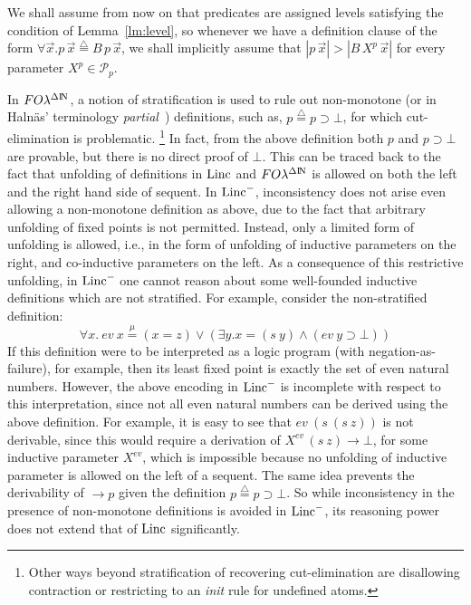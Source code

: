\documentclass[preprint]{elsarticle}
\def\Pscr{{\mathcal P}}
\newcommand{\FOL   }{FO\lambda}
\newcommand{\FOLDN }{\FOL^{\Delta\N}}
\newcommand{\Linc}{{\rm Linc}^-}
\newcommand{\fLinc}{{\rm Linc}}
\newcommand{\N}{{\rm I} \! {\rm N}}
\newcommand{\Seq}[2]{#1\longrightarrow #2}
\newcommand{\defeq}{\stackrel{\scriptscriptstyle\triangle}{=}}
\newcommand{\defmu}{\stackrel{\mu}{=}}
\newcommand{\oimp}{\supset}
\begin{document}
We shall assume from now on that predicates are assigned levels
satisfying the condition of Lemma~\ref{lm:level}, so whenever we have
a definition clause of the form $\forall \vec x.p\,\vec x \defeq
B\,p\,\vec x$, we shall implicitly assume that $|p\,\vec x| >
|B\,X^p\,\vec x|$ for every parameter $X^p \in \Pscr_p.$





\begin{remark}
  \label{rem:strat}
In $\FOLDN$, a notion of stratification is used to rule out
  non-monotone (or in Haln\"{a}s' terminology
  \emph{partial}~\cite{PID}) definitions, such as, $p \defeq p \oimp
  \bot$, for which cut-elimination is problematic. \footnote{Other
    ways beyond stratification of recovering cut-elimination are
    disallowing contraction or restricting to an \textit{init} rule
    for undefined atoms.}  In fact, from the above definition both $p$ and $p \oimp \bot$ are
  provable, but there is no direct proof of $\bot$. This can be traced
  back to the fact that unfolding of definitions in $\fLinc$ and
  $\FOLDN$ is allowed on both the left and the right hand side of
  sequent. In $\Linc$, inconsistency does not arise even allowing a non-monotone
  definition as above, due to the fact that arbitrary unfolding of
  fixed points is not permitted. Instead, only a limited form of unfolding is allowed, i.e., in the
  form of unfolding of inductive parameters on the right, and
  co-inductive parameters on the left.  As a consequence of this
  restrictive unfolding, in $\Linc$ one cannot reason about some
  well-founded inductive definitions which are not 
  stratified. For example, consider the non-stratified definition:
$$
\forall x.\ ev~x \defmu (x = z) \lor (\exists y. x = (s~y) \land (ev~y
\oimp \bot))
$$
If this definition were to be interpreted as a logic program (with
negation-as-failure), for example, then its least fixed point is
exactly the set of even natural numbers. However, the above encoding
in $\Linc$ is incomplete with respect to this interpretation, since
not all even natural numbers can be derived using the above
definition.  For example, it is easy to see that $ev~(s~(s~z))$ is not
derivable, since this would require a derivation of
$\Seq{X^{ev}\,(s~z)} \bot$, for some inductive parameter $X^{ev}$,
which is impossible because no unfolding of inductive parameter is
allowed on the left of a sequent. The same idea prevents the
derivability of $\Seq{} p$ given the definition $p \defeq p \oimp
\bot$. So while inconsistency in the presence of non-monotone
definitions is avoided in $\Linc$, its reasoning power does not extend
that of $\fLinc$ significantly.
\end{remark}
\end{document}
